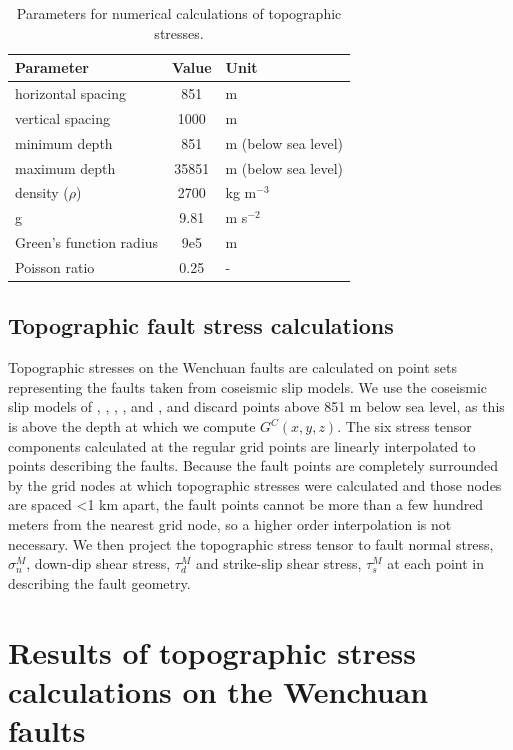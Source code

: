 \documentclass[twocolumn,jgrga]{AGUTeX}
\begin{document}
\begin{article}
\begin{table}
\centering
\begin{tabular}{l c l}
\hline
Parameter & Value & Unit \\
\hline
horizontal spacing & 851 & m \\ 
vertical spacing & 1000 & m \\ 
minimum depth & 851 & m (below sea level) \\ 
maximum depth & 35851 & m (below sea level) \\ 
density ($\rho$) & 2700 & kg m$^{-3}$ \\ 
g & 9.81 & m s$^{-2}$ \\ 
Green's function radius & 9e5 & m \\ 
Poisson ratio & 0.25 & - \\ 
\hline
\end{tabular}
\caption{Parameters for numerical calculations of topographic stresses.}
\label{table:convo_params}
\end{table}

\subsection{Topographic fault stress
calculations}\label{topographic-fault-stress-calculations}

Topographic stresses on the Wenchuan faults are calculated on point sets
representing the faults taken from coseismic slip models. We use the
coseismic slip models of \citet{shen2009},
\citet{feng2010}, \citet{qi2011}, \citet{zhang2011},
and \citet{fielding2013}, and discard
points above 851 m below sea level, as this is above the depth at which
we compute $G^C(x,y,z)$. The six stress tensor components calculated at
the regular grid points are linearly interpolated to points describing
the faults. Because the fault points are completely surrounded by the
grid nodes at which topographic stresses were calculated and those nodes
are spaced \textless{}1 km apart, the fault points cannot be more than a
few hundred meters from the nearest grid node, so a higher order
interpolation is not necessary. We then project the topographic stress
tensor to fault normal stress, $\sigma_n^M$, down-dip shear stress,
$\tau_d^M$ and strike-slip shear stress, $\tau_s^M$ at each point in
describing the fault geometry.

\section{Results of topographic stress calculations on the Wenchuan
faults}\label{results-of-topographic-stress-calculations-on-the-wenchuan-faults}


\end{article}
\end{document}
